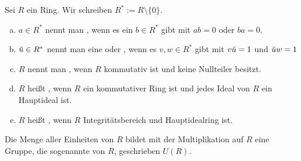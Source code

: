 \begin{df} \label{1.1}
	Sei $R$ ein Ring.
	Wir schreiben $R^* := R \setminus \{0\}$.
	\begin{enumerate}[a)]
		\item
			$a \in R^*$ nennt man , wenn es ein $b \in R^*$ gibt mit $ab = 0$ oder $ba = 0$.
		\item
			$\breve{u} \in R^*$ nennt man eine  oder , wenn es $v, w \in R^*$ gibt mit $v \breve{u} = 1$ und $\breve{u} w = 1$
		\item
			$R$ nennt man , wenn $R$ kommutativ ist und keine Nullteiler besitzt.
		\item
			$R$ heißt , wenn $R$ ein kommutativer Ring ist und jedes Ideal von $R$ ein Hauptideal ist.
		\item
			$R$ heißt , wenn $R$ Integritätsbereich und Hauptidealring ist.
	\end{enumerate}
	Die Menge aller Einheiten von $R$ bildet mit der Multiplikation auf $R$ eine Gruppe, die sogenannte  von $R$, geschrieben $U(R)$.
\end{df}


